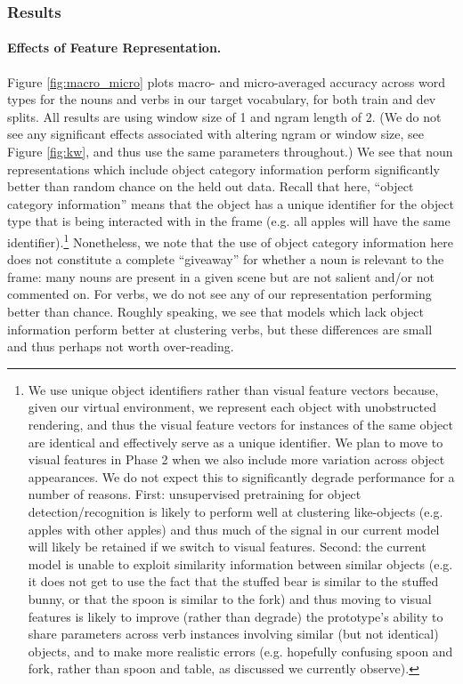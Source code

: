 \documentclass[11pt]{article}
\begin{document}
\subsubsection{Results}
\label{sec:cluster-results}

\paragraph{Effects of Feature Representation.} Figure \ref{fig:macro_micro} plots macro- and micro-averaged accuracy across word types for the nouns and verbs in our target vocabulary, for both train and dev splits. All results are using window size of 1 and ngram length of 2. (We do not see any significant effects associated with altering ngram or window size, see Figure \ref{fig:kw}, and thus use the same parameters throughout.) We see that noun representations which include object category information perform significantly better than random chance on the held out data. Recall that here, ``object category information'' means that the object has a unique identifier for the object type that is being interacted with in the frame (e.g. all apples will have the same identifier).\footnote{We use unique object identifiers rather than visual feature vectors because, given our virtual environment, we represent each object with unobstructed rendering, and thus the visual feature vectors for instances of the same object are identical and effectively serve as a unique identifier. We plan to move to visual features in Phase 2 when we also include more variation across object appearances. We do not expect this to significantly degrade performance for a number of reasons. First: unsupervised pretraining for object detection/recognition is likely to perform well at clustering like-objects (e.g. apples with other apples) and thus much of the signal in our current model will likely be retained if we switch to visual features. Second: the current model is unable to exploit similarity information between similar objects (e.g. it does not get to use the fact that the stuffed bear is similar to the stuffed bunny, or that the spoon is similar to the fork) and thus moving to visual features is likely to improve (rather than degrade) the prototype's ability to share parameters across verb instances involving similar (but not identical) objects, and to make more realistic errors (e.g. hopefully confusing spoon and fork, rather than spoon and table, as discussed we currently observe).}
Nonetheless, we note that the use of object category information here does not constitute a complete ``giveaway'' for whether a noun is relevant to the frame: many nouns are present in a given scene but are not salient and/or not commented on. For verbs, we do not see any of our representation performing better than chance. Roughly speaking, we see that models which lack object information perform better at clustering verbs, but these differences are small and thus perhaps not worth over-reading.
\end{document}
